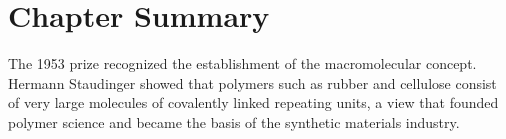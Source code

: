 \clearpage

\section*{Chapter Summary}

The 1953 prize recognized the establishment of the macromolecular concept. Hermann Staudinger showed that polymers such as rubber and cellulose consist of very large molecules of covalently linked repeating units, a view that founded polymer science and became the basis of the synthetic materials industry.

